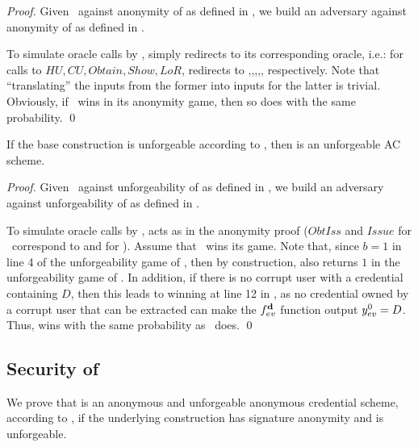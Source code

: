 \begin{proof}
  Given \adv~against anonymity of \CUASAC as defined in \cite{fhs19}, we build
  an adversary \advB against anonymity of \CUASGen as defined in
  .

  To simulate oracle calls by \adv, \advB simply redirects to its corresponding
  oracle, i.e.: for calls to $HU,CU,Obtain,Show,LoR$, \advB redirects to
  \HUGEN,\CUGEN,\OBTAIN,\SIGN,\CHALb, respectively. Note that ``translating''
  the inputs from the former into inputs for the latter is trivial.
  Obviously, if \adv~wins in its anonymity game, then so does \advB with the
  same probability.
  \qed
\end{proof}

\begin{theorem}
  \label{thm:forge-cuasac}
  If the base \CUASGen construction is unforgeable according to
  , then \CUASAC is an unforgeable AC scheme.
\end{theorem}

\begin{proof}
  Given \adv~against unforgeability of \CUASAC as defined in \cite{fhs19}, we
  build an adversary \advB against unforgeability of \CUASGen as defined in
  .

  To simulate oracle calls by \adv, \advB acts as in the anonymity proof
  ($ObtIss$ and $Issue$ for \adv~correspond to \OBTISS and \ISSUE for \advB).
  Assume that \adv~wins its game. Note that, since $b=1$ in line 4 of the
  unforgeability game of , then by construction, \Verify
  also returns $1$ in the unforgeability game of \UAS. In addition, if
  there is no corrupt user with a credential containing $D$, then this leads to
  \advB winning at line 12 in , as no credential
  owned by a corrupt user that can be extracted can make the $f_{ev}^{\mathbf{d}}$
  function output $y_{ev}^0=D$. Thus, \advB wins with the same probability as
  \adv~does.  
  \qed
\end{proof}

\subsection{Security of \CUASRAC}

We prove that \CUASRAC is an anonymous and unforgeable anonymous credential
scheme, according to \cite{fhs19}, if the underlying \CUASGen construction
has signature anonymity and is unforgeable.

